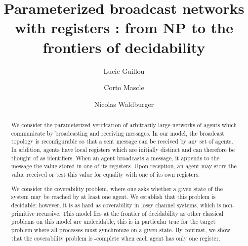\documentclass[a4paper,UKenglish,cleveref, autoref, thm-restate]{lipics-v2021}
\title{Parameterized broadcast networks with registers : from NP to the frontiers of decidability}
\author{Lucie Guillou}{IRIF, Université de Paris}{}{}{}
\author{Corto Mascle}{LaBRI, Université de Bordeaux}{}{}{}
\author{Nicolas Waldburger}{IRISA, Universit\'e de Rennes}{}{}{}
\begin{document}
	
	\maketitle
	
		
	

	\begin{abstract}
	We consider the parameterized verification of arbitrarily large networks of agents which communicate by broadcasting and receiving messages. In our model, the broadcast topology is reconfigurable so that a sent message can be received by any set of agents. In addition, agents have local registers which are initially distinct and can therefore be thought of as identifiers.
	When an agent broadcasts a message, it appends to the message the value stored in one of its registers. Upon reception, an agent may store the value received or test this value for equality with one of its own registers. 

	We consider the coverability problem, where one asks whether a given state of the system may be reached by at least one agent. We establish that this problem is decidable; however, it is as hard as coverability in lossy channel systems, which is non-primitive recursive. 
	This model lies at the frontier of decidability as other classical problems on this model are undecidable; this is in particular true for the target problem where all processes must synchronize on a given state. 
	By contrast, we show that the coverability problem is \NP-complete when each agent has only one register.
	
	\end{abstract}
\end{document}
